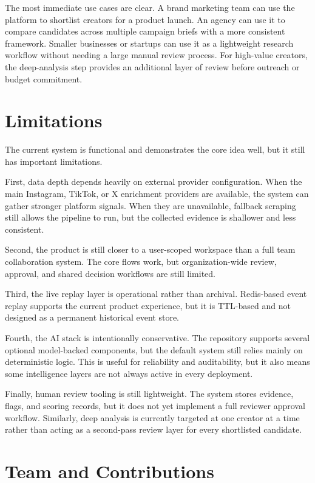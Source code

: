 \documentclass[11pt,a4paper]{article}
\begin{document}
The most immediate use cases are clear. A brand marketing team can use the platform to shortlist creators for a product launch. An agency can use it to compare candidates across multiple campaign briefs with a more consistent framework. Smaller businesses or startups can use it as a lightweight research workflow without needing a large manual review process. For high-value creators, the deep-analysis step provides an additional layer of review before outreach or budget commitment.

\section{Limitations}

The current system is functional and demonstrates the core idea well, but it still has important limitations.

First, data depth depends heavily on external provider configuration. When the main Instagram, TikTok, or X enrichment providers are available, the system can gather stronger platform signals. When they are unavailable, fallback scraping still allows the pipeline to run, but the collected evidence is shallower and less consistent.

Second, the product is still closer to a user-scoped workspace than a full team collaboration system. The core flows work, but organization-wide review, approval, and shared decision workflows are still limited.

Third, the live replay layer is operational rather than archival. Redis-based event replay supports the current product experience, but it is TTL-based and not designed as a permanent historical event store.

Fourth, the AI stack is intentionally conservative. The repository supports several optional model-backed components, but the default system still relies mainly on deterministic logic. This is useful for reliability and auditability, but it also means some intelligence layers are not always active in every deployment.

Finally, human review tooling is still lightweight. The system stores evidence, flags, and scoring records, but it does not yet implement a full reviewer approval workflow. Similarly, deep analysis is currently targeted at one creator at a time rather than acting as a second-pass review layer for every shortlisted candidate.

\section{Team and Contributions}
\end{document}
